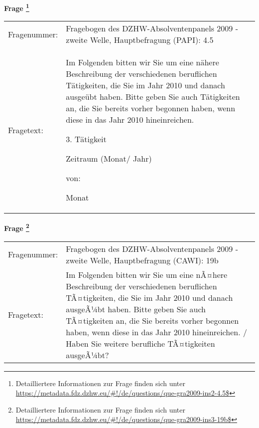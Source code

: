 				\vspace*{0.5cm}
                \noindent\textbf{Frage
	                \footnote{Detailliertere Informationen zur Frage finden sich unter
		              \url{https://metadata.fdz.dzhw.eu/\#!/de/questions/que-gra2009-ins2-4.5$}}}\\
				\begin{tabularx}{\hsize}{@{}lX}
					Fragenummer: &
					  Fragebogen des DZHW-Absolventenpanels 2009 - zweite Welle, Hauptbefragung (PAPI):
					  4.5
 \\
					Fragetext: & Im Folgenden bitten wir Sie um eine nähere Beschreibung der verschiedenen beruflichen Tätigkeiten, die Sie im Jahr 2010 und danach ausgeübt haben. Bitte geben Sie auch Tätigkeiten an, die Sie bereits vorher begonnen haben, wenn diese in das Jahr 2010 hineinreichen.\par  3. Tätigkeit\par  Zeitraum (Monat/ Jahr)\par  von:\par  Monat \\
				\end{tabularx}
				\vspace*{0.5cm}
                \noindent\textbf{Frage
	                \footnote{Detailliertere Informationen zur Frage finden sich unter
		              \url{https://metadata.fdz.dzhw.eu/\#!/de/questions/que-gra2009-ins3-19b$}}}\\
				\begin{tabularx}{\hsize}{@{}lX}
					Fragenummer: &
					  Fragebogen des DZHW-Absolventenpanels 2009 - zweite Welle, Hauptbefragung (CAWI):
					  19b
 \\
					Fragetext: & Im Folgenden bitten wir Sie um eine nÃ¤here Beschreibung der verschiedenen beruflichen TÃ¤tigkeiten, die Sie im Jahr 2010 und danach ausgeÃ¼bt haben. Bitte geben Sie auch TÃ¤tigkeiten an, die Sie bereits vorher begonnen haben, wenn diese in das Jahr 2010 hineinreichen. / Haben Sie weitere berufliche TÃ¤tigkeiten ausgeÃ¼bt? \\
				\end{tabularx}






